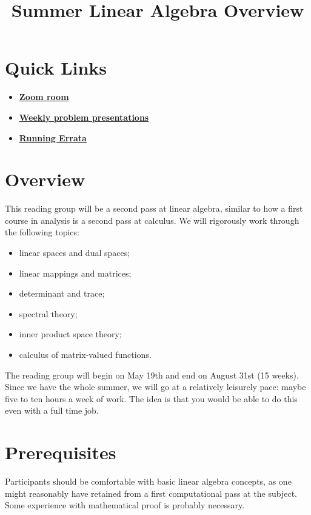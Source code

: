 \documentclass{article}
\title{Summer Linear Algebra Overview}
\begin{document}
\maketitle

\section{Quick Links}
\begin{itemize}
  \item \href{https://us06web.zoom.us/j/86241673980}{\textbf{Zoom room}}
  \item \href{https://www.overleaf.com/8251467867kkqxyvzcmndp#f019d2}{\textbf{Weekly problem presentations}}
  \item \href{https://www.overleaf.com/7498622626cjfdwmgbbcjq#7b94e3}{\textbf{Running Errata}}
\end{itemize}

\section{Overview}
This reading group will be a second pass at linear algebra, similar to how a first course in analysis is a second pass at calculus. We will rigorously work through the following topics:
\begin{itemize}
    \item linear spaces and dual spaces;
    \item linear mappings and matrices;
    \item determinant and trace;
    \item spectral theory;
    \item inner product space theory;
    \item calculus of matrix-valued functions.
\end{itemize}

The reading group will begin on May 19th and end on August 31st (15 weeks). Since we have the whole summer, we will go at a relatively leisurely pace: maybe five to ten hours a week of work. The idea is that you would be able to do this even with a full time job.

\section{Prerequisites}
Participants should be comfortable with basic linear algebra concepts, as one might reasonably have retained from a first computational pass at the subject. Some experience with mathematical proof is probably necessary.
\end{document}
